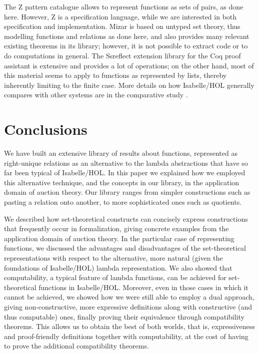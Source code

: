 \documentclass[
]{llncs}
\newcommand{\junction}{compatibility}
\newcommand{\I}{Isabelle}
\newcommand{\M}{Mizar}
\begin{document}
The Z pattern catalogue \cite[Section~IV]{valentine2004az} allows to represent functions as sets of pairs, as done here.
However, Z is a specification language, while we are interested in both specification and implementation.
\M{} is based on untyped set theory, thus modelling functions and relations as done here, and also provides many relevant existing theorems in its library; however, it is not possible to extract code or to do computations in general.
The Ssreflect extension library for the Coq proof assistant is extensive and provides a lot of operations; on the other hand, most of this material seems to apply to functions as represented by lists, thereby inherently limiting to the finite case.
More details on how \I{}/HOL generally compares with other systems are 
in the comparative study \cite{la-ca-ke-mo-ro-we-ww-13}.

\section{Conclusions}\label{RefConclusions}

We have built an extensive library of results about functions, represented as right-unique relations as an alternative to the lambda abstractions that have so far been typical of \I{}/HOL.
In this paper we explained how we employed this alternative technique, and the concepts in our library, in the application domain of auction theory.
Our library ranges from simpler constructions such as pasting a relation onto another, to more sophisticated ones such as quotients.

We described how set-theoretical constructs can concisely express constructions that frequently occur in formalization, giving concrete examples from the application domain of auction theory.
In the particular case of representing functions, we discussed the advantages and disadvantages of the set-theoretical representations with respect to the alternative, more natural (given the foundations of \I/HOL) lambda representation.
We also showed that computability, a typical feature of lambda functions, can be achieved for set-theoretical functions in \I/HOL.
Moreover, even in those cases in which it cannot be achieved, we showed how we were still able to employ a dual approach, giving non-constructive, more expressive definitions along with constructive (and thus computable) ones, finally proving their equivalence through \junction{} theorems.
This allows us to obtain the best of both worlds, that is, expressiveness and proof-friendly definitions together with computability, at the cost of having to prove the additional \junction{} theorems.
\end{document}
